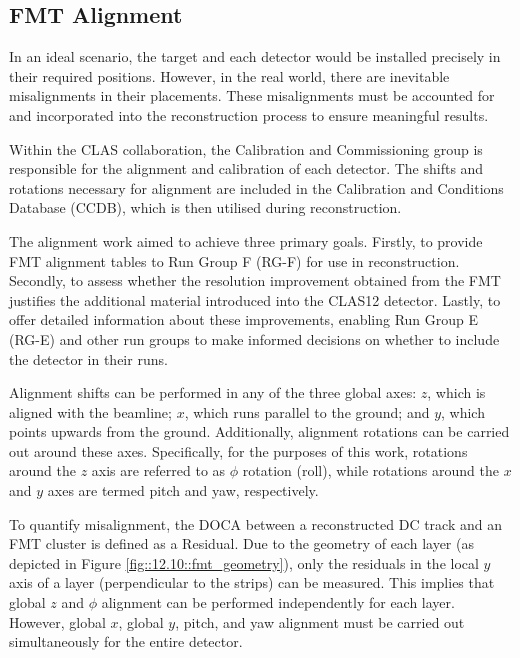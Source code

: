 \subsection{FMT Alignment}
\label{12.20::fmt_alignment}
    In an ideal scenario, the target and each detector would be installed precisely in their required positions.
    However, in the real world, there are inevitable misalignments in their placements.
    These misalignments must be accounted for and incorporated into the reconstruction process to ensure meaningful results.

    Within the CLAS collaboration, the Calibration and Commissioning group is responsible for the alignment and calibration of each detector.
    The shifts and rotations necessary for alignment are included in the Calibration and Conditions Database (CCDB), which is then utilised during reconstruction.

    The alignment work aimed to achieve three primary goals.
    Firstly, to provide FMT alignment tables to Run Group F (RG-F) for use in reconstruction.
    Secondly, to assess whether the resolution improvement obtained from the FMT justifies the additional material introduced into the CLAS12 detector.
    Lastly, to offer detailed information about these improvements, enabling Run Group E (RG-E) and other run groups to make informed decisions on whether to include the detector in their runs.

    Alignment shifts can be performed in any of the three global axes: $z$, which is aligned with the beamline; $x$, which runs parallel to the ground; and $y$, which points upwards from the ground.
    Additionally, alignment rotations can be carried out around these axes.
    Specifically, for the purposes of this work, rotations around the $z$ axis are referred to as $\phi$ rotation (roll), while rotations around the $x$ and $y$ axes are termed pitch and yaw, respectively.

    To quantify misalignment, the DOCA between a reconstructed DC track and an FMT cluster is defined as a Residual.
    Due to the geometry of each layer (as depicted in Figure \ref{fig::12.10::fmt_geometry}), only the residuals in the local $y$ axis of a layer (perpendicular to the strips) can be measured.
    This implies that global $z$ and $\phi$ alignment can be performed independently for each layer.
    However, global $x$, global $y$, pitch, and yaw alignment must be carried out simultaneously for the entire detector.

